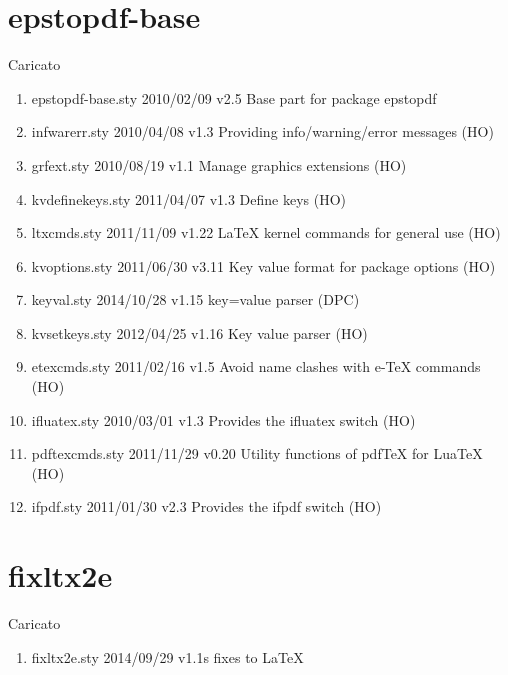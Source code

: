 \section{epstopdf-base}

Caricato 
\begin{enumerate}
\item epstopdf-base.sty 2010/02/09 v2.5 Base part for package epstopdf
\item infwarerr.sty 2010/04/08 v1.3 Providing info/warning/error messages (HO)
\item grfext.sty 2010/08/19 v1.1 Manage graphics extensions (HO)
\item kvdefinekeys.sty 2011/04/07 v1.3 Define keys (HO)
\item ltxcmds.sty 2011/11/09 v1.22 LaTeX kernel commands for general use (HO)
\item kvoptions.sty 2011/06/30 v3.11 Key value format for package options (HO)
\item keyval.sty 2014/10/28 v1.15 key=value parser (DPC)
\item kvsetkeys.sty 2012/04/25 v1.16 Key value parser (HO)
\item etexcmds.sty 2011/02/16 v1.5 Avoid name clashes with e-TeX commands (HO)
\item ifluatex.sty 2010/03/01 v1.3 Provides the ifluatex switch (HO)
\item pdftexcmds.sty 2011/11/29 v0.20 Utility functions of pdfTeX for LuaTeX (HO)
\item ifpdf.sty 2011/01/30 v2.3 Provides the ifpdf switch (HO)
\end{enumerate}	
\section{fixltx2e}

Caricato 
\begin{enumerate}
\item fixltx2e.sty 2014/09/29 v1.1s fixes to LaTeX
\end{enumerate}	
